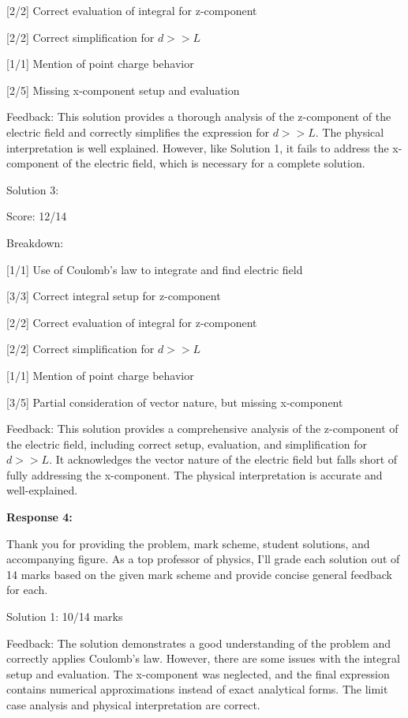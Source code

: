 \documentclass[a4paper,11pt]{article}
\begin{document}
[2/2] Correct evaluation of integral for z-component

[2/2] Correct simplification for \(d >> L\)

[1/1] Mention of point charge behavior

[2/5] Missing x-component setup and evaluation

Feedback: This solution provides a thorough analysis of the z-component of the electric field and correctly simplifies the expression for \(d >> L\). The physical interpretation is well explained. However, like Solution 1, it fails to address the x-component of the electric field, which is necessary for a complete solution.

Solution 3:

Score: 12/14

Breakdown:

[1/1] Use of Coulomb's law to integrate and find electric field

[3/3] Correct integral setup for z-component

[2/2] Correct evaluation of integral for z-component

[2/2] Correct simplification for \(d >> L\)

[1/1] Mention of point charge behavior

[3/5] Partial consideration of vector nature, but missing x-component

Feedback: This solution provides a comprehensive analysis of the z-component of the electric field, including correct setup, evaluation, and simplification for \(d >> L\). It acknowledges the vector nature of the electric field but falls short of fully addressing the x-component. The physical interpretation is accurate and well-explained.

\bigskip
\textbf{Response 4:}

Thank you for providing the problem, mark scheme, student solutions, and accompanying figure. As a top professor of physics, I'll grade each solution out of 14 marks based on the given mark scheme and provide concise general feedback for each.

Solution 1: 10/14 marks

Feedback: The solution demonstrates a good understanding of the problem and correctly applies Coulomb's law. However, there are some issues with the integral setup and evaluation. The x-component was neglected, and the final expression contains numerical approximations instead of exact analytical forms. The limit case analysis and physical interpretation are correct.
\end{document}
